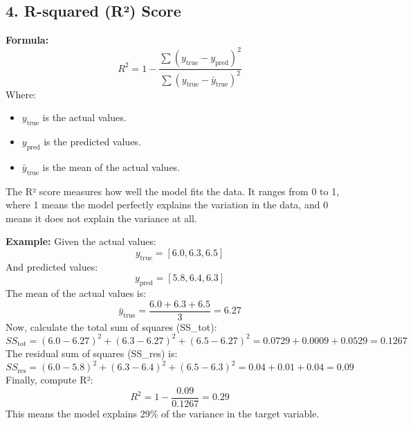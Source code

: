 \documentclass[12pt]{article}
\begin{document}
\subsection*{4. R-squared (R²) Score}

\textbf{Formula:}  
\[
R^2 = 1 - \frac{\sum (y_{\text{true}} - y_{\text{pred}})^2}{\sum (y_{\text{true}} - \bar{y}_{\text{true}})^2}
\]
Where:
\begin{itemize}
    \item \( y_{\text{true}} \) is the actual values.
    \item \( y_{\text{pred}} \) is the predicted values.
    \item \( \bar{y}_{\text{true}} \) is the mean of the actual values.
\end{itemize}

The R² score measures how well the model fits the data. It ranges from 0 to 1, where 1 means the model perfectly explains the variation in the data, and 0 means it does not explain the variance at all.

\textbf{Example:}  
Given the actual values:
\[
y_{\text{true}} = [6.0, 6.3, 6.5]
\]
And predicted values:
\[
y_{\text{pred}} = [5.8, 6.4, 6.3]
\]
The mean of the actual values is:
\[
\bar{y}_{\text{true}} = \frac{6.0 + 6.3 + 6.5}{3} = 6.27
\]
Now, calculate the total sum of squares (SS\_tot):
\[
SS_{\text{tot}} = (6.0 - 6.27)^2 + (6.3 - 6.27)^2 + (6.5 - 6.27)^2 = 0.0729 + 0.0009 + 0.0529 = 0.1267
\]
The residual sum of squares (SS\_res) is:
\[
SS_{\text{res}} = (6.0 - 5.8)^2 + (6.3 - 6.4)^2 + (6.5 - 6.3)^2 = 0.04 + 0.01 + 0.04 = 0.09
\]
Finally, compute R²:
\[
R^2 = 1 - \frac{0.09}{0.1267} = 0.29
\]
This means the model explains 29\% of the variance in the target variable.
\end{document}
